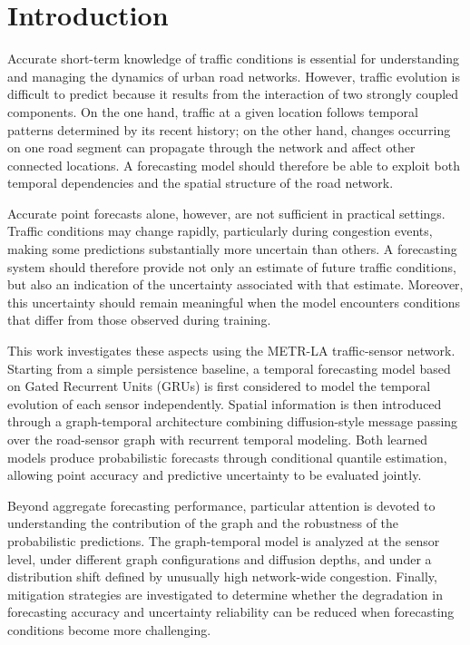 \section{Introduction}
\label{sec:introduction}

Accurate short-term knowledge of traffic conditions is essential for
understanding and managing the dynamics of urban road networks.
However, traffic evolution is difficult to predict because it results from
the interaction of two strongly coupled components. On the one hand, traffic
at a given location follows temporal patterns determined by its recent
history; on the other hand, changes occurring on one road segment can
propagate through the network and affect other connected locations. A
forecasting model should therefore be able to exploit both temporal
dependencies and the spatial structure of the road network.

Accurate point forecasts alone, however, are not sufficient in practical
settings. Traffic conditions may change rapidly, particularly during
congestion events, making some predictions substantially more uncertain than
others. A forecasting system should therefore provide not only an estimate of
future traffic conditions, but also an indication of the uncertainty
associated with that estimate. Moreover, this uncertainty should remain
meaningful when the model encounters conditions that differ from those
observed during training.

This work investigates these aspects using the METR-LA traffic-sensor
network. Starting from a simple persistence baseline, a temporal forecasting
model based on Gated Recurrent Units (GRUs) is first considered to model the
temporal evolution of each sensor independently. Spatial information is then
introduced through a graph-temporal architecture combining diffusion-style
message passing over the road-sensor graph with recurrent temporal modeling.
Both learned models produce probabilistic forecasts through conditional
quantile estimation, allowing point accuracy and predictive uncertainty to be
evaluated jointly.

Beyond aggregate forecasting performance, particular attention is devoted to
understanding the contribution of the graph and the robustness of the
probabilistic predictions. The graph-temporal model is analyzed at the sensor
level, under different graph configurations and diffusion depths, and under a
distribution shift defined by unusually high network-wide congestion.
Finally, mitigation strategies are investigated to determine whether the
degradation in forecasting accuracy and uncertainty reliability can be reduced
when forecasting conditions become more challenging.


